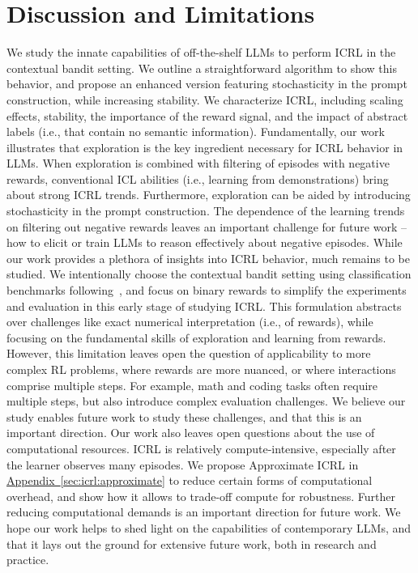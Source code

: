 \documentclass{article}
\theoremstyle{plain}
\theoremstyle{definition}
\theoremstyle{remark}
\newcommand{\aautoref}[1]{\hyperref[#1]{Appendix~\ref*{#1}}}
\newcommand{\approximate}{Approximate ICRL\xspace}
\begin{document}
\section{Discussion and Limitations}\label{sec:disc}
We study the innate capabilities of off-the-shelf LLMs to perform ICRL in the contextual bandit setting. We outline a straightforward algorithm to show this behavior, and propose an enhanced version featuring stochasticity in the prompt construction, while increasing stability.
We characterize ICRL, including scaling effects, stability, the importance of the reward signal, and the impact of abstract labels (i.e., that contain no semantic information).
Fundamentally, our work illustrates that exploration is the key ingredient necessary for ICRL behavior in LLMs. When exploration is combined with filtering of episodes with negative rewards, conventional ICL abilities (i.e., learning from demonstrations) bring about strong ICRL trends.
Furthermore, exploration can be aided by introducing stochasticity in the prompt construction.
The dependence of the learning trends on filtering out negative rewards leaves an important challenge for future work -- how to elicit or train LLMs to reason effectively about negative episodes.
While our work provides a plethora of insights into ICRL behavior, much remains to be studied.
We intentionally choose the contextual bandit setting using classification benchmarks following~\citep{pmlr-v97-zhang19b, bietti2021contextual}, and focus on binary rewards to simplify the experiments and evaluation in this early stage of studying ICRL. This formulation abstracts over challenges like exact numerical interpretation (i.e., of rewards), while focusing on the fundamental skills of exploration and learning from rewards.
However, this limitation leaves open the question of applicability to more complex RL problems, where rewards are more nuanced, or where interactions comprise multiple steps.
For example, math and coding tasks often require multiple steps, but also introduce complex evaluation challenges.
We believe our study enables future work to study these challenges, and that this is an important direction.
Our work also leaves open questions about the use of computational resources. ICRL is relatively compute-intensive, especially after the learner observes many episodes.
We propose \approximate in \aautoref{sec:icrl:approximate} to reduce certain forms of computational overhead, and show how it allows to trade-off compute for robustness.
Further reducing computational demands is an important direction for future work.
We hope our work helps to shed light on the capabilities of contemporary LLMs, and that it lays out the ground for extensive future work, both in research and practice.
\end{document}
